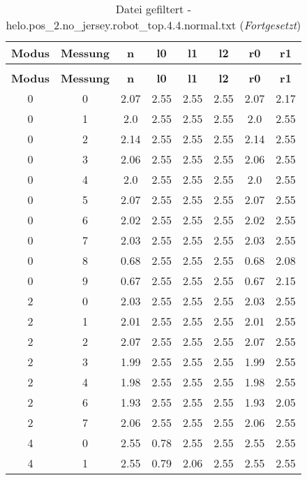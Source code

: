 \begin{longtable}{|c|c||c||c|c|c||c|c|}
	\caption{Datei gefiltert - helo.pos\_2.no\_jersey.robot\_top.4.4.normal.txt} \label{tab:helo.pos-2.no-jersey.robot-top.4.4.normal.txt} \\ \hline
	\textbf{Modus} & \textbf{Messung} & \textbf{n} & \textbf{l0} & \textbf{l1} & \textbf{l2} & \textbf{r0} & \textbf{r1}\\ \hline
	\endfirsthead
	\caption[]{Datei gefiltert - helo.pos\_2.no\_jersey.robot\_top.4.4.normal.txt (\emph{Fortgesetzt})} \\ \hline
	\textbf{Modus} & \textbf{Messung} & \textbf{n} & \textbf{l0} & \textbf{l1} & \textbf{l2} & \textbf{r0} & \textbf{r1}\\ \hline
	\endhead
	0 & 0 & 2.07 & 2.55 & 2.55 & 2.55 & 2.07 & 2.17 \\ \hline
	0 & 1 & 2.0 & 2.55 & 2.55 & 2.55 & 2.0 & 2.55 \\ \hline
	0 & 2 & 2.14 & 2.55 & 2.55 & 2.55 & 2.14 & 2.55 \\ \hline
	0 & 3 & 2.06 & 2.55 & 2.55 & 2.55 & 2.06 & 2.55 \\ \hline
	0 & 4 & 2.0 & 2.55 & 2.55 & 2.55 & 2.0 & 2.55 \\ \hline
	0 & 5 & 2.07 & 2.55 & 2.55 & 2.55 & 2.07 & 2.55 \\ \hline
	0 & 6 & 2.02 & 2.55 & 2.55 & 2.55 & 2.02 & 2.55 \\ \hline
	0 & 7 & 2.03 & 2.55 & 2.55 & 2.55 & 2.03 & 2.55 \\ \hline
	0 & 8 & 0.68 & 2.55 & 2.55 & 2.55 & 0.68 & 2.08 \\ \hline
	0 & 9 & 0.67 & 2.55 & 2.55 & 2.55 & 0.67 & 2.15 \\ \hline
	2 & 0 & 2.03 & 2.55 & 2.55 & 2.55 & 2.03 & 2.55 \\ \hline
	2 & 1 & 2.01 & 2.55 & 2.55 & 2.55 & 2.01 & 2.55 \\ \hline
	2 & 2 & 2.07 & 2.55 & 2.55 & 2.55 & 2.07 & 2.55 \\ \hline
	2 & 3 & 1.99 & 2.55 & 2.55 & 2.55 & 1.99 & 2.55 \\ \hline
	2 & 4 & 1.98 & 2.55 & 2.55 & 2.55 & 1.98 & 2.55 \\ \hline
	2 & 6 & 1.93 & 2.55 & 2.55 & 2.55 & 1.93 & 2.05 \\ \hline
	2 & 7 & 2.06 & 2.55 & 2.55 & 2.55 & 2.06 & 2.55 \\ \hline
	4 & 0 & 2.55 & 0.78 & 2.55 & 2.55 & 2.55 & 2.55 \\ \hline
	4 & 1 & 2.55 & 0.79 & 2.06 & 2.55 & 2.55 & 2.55 \\ \hline

\end{longtable}

